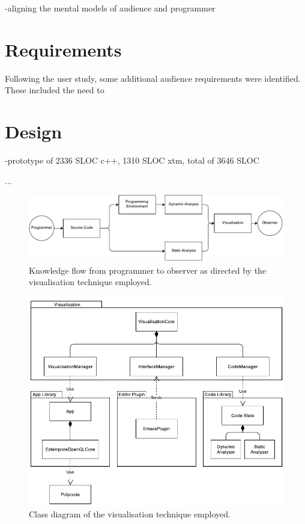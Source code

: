-aligning the mental models of audience and programmer

\more

\section{Requirements}

Following the user study, some additional audience requirements were identified. These included the need to 

\section{Design}

-prototype of 2336 SLOC c++, 1310 SLOC xtm, total of 3646 SLOC

\cite{Purchase1996}...

\begin{figure}
  \centering \includegraphics[width=\columnwidth]{../images/diagrams/knowledge-flow-refined.pdf}
  \caption{Knowledge flow from programmer to observer as directed by the visualisation technique employed.}
\label{fig:knowledge-flow-refined}
\end{figure}

\begin{figure}
  \centering \includegraphics[width=\columnwidth]{../images/diagrams/visualisation-class-diagram.pdf}
  \caption{Class diagram of the visualisation technique employed.}
\label{fig:visualisation-class-diagram}
\end{figure}


